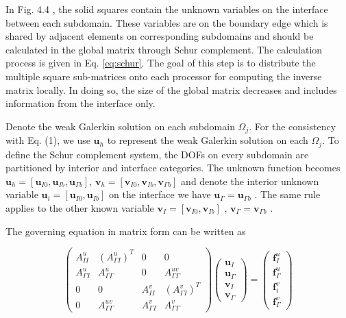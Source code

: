 In Fig. 4.4 , the solid squares contain the unknown variables on the interface between each subdomain. These variables are on the boundary edge which is shared by adjacent elements on corresponding subdomains and should be calculated in the global matrix through Schur complement. The calculation process is given in Eq. \eqref{eq:schur}. The goal of this step is to distribute the multiple square sub-matrices onto each processor for computing the inverse matrix locally. In doing so, the size of the global matrix decreases and includes information from the interface only. 

Denote the weak Galerkin solution on each subdomain $ \Omega_{j} $.  For the consistency with Eq. (1), we use $ \mathbf{u}_{h} $  to represent the weak Galerkin solution on each $ \Omega_{j} $. To define the Schur complement system, the DOFs on every subdomain are partitioned by interior and interface categories. The unknown function becomes $ \mathbf{u}_{h} = [\mathbf{u}_{I0}, \mathbf{u}_{Ib}, \mathbf{u}_{\Gamma b}] $, $ \mathbf{v}_{h} = [\mathbf{v}_{I0}, \mathbf{v}_{Ib}, \mathbf{v}_{\Gamma b}] $ and denote the interior unknown variable $ \mathbf{u}_{i} = [\mathbf{u}_{I0}, \mathbf{u}_{Ib}] $ on the interface we have $ \mathbf{u}_{\Gamma} = \mathbf{u}_{\Gamma b} $ . The same rule applies to the other known variable $ \mathbf{v}_I = [\mathbf{v}_{I0}, \mathbf{v}_{Ib}] $ , $ \mathbf{v}_{\Gamma} = \mathbf{v}_{\Gamma b} $ . 

The governing equation in matrix form can be written as 

\begin{equation}
\begin{pmatrix}
A_{II}^{u} & (A_{\Gamma I}^{u})^{T} & 0 & 0 \\
A_{\Gamma I}^{u} & A_{\Gamma \Gamma}^{u} & 0 & A_{\Gamma \Gamma}^{uv} \\
0 & 0 & A_{II}^{v} & (A_{\Gamma I}^{v})^{T} \\
0 & A_{\Gamma \Gamma}^{uv} & A_{\Gamma I}^{v} & A_{\Gamma \Gamma}^{v} 
\end{pmatrix} 
\begin{pmatrix}
\mathbf{u}_{I} \\ \mathbf{u}_{\Gamma} \\ \mathbf{v}_{I} \\ \mathbf{v}_{\Gamma}
\end{pmatrix} = \begin{pmatrix}
\mathbf{f}_{I}^{u} \\ \mathbf{f}_{\Gamma}^{u} \\ \mathbf{f}_{i}^{v} \\ \mathbf{f}_{\Gamma}^{v} 
\end{pmatrix}
\end{equation}
%

